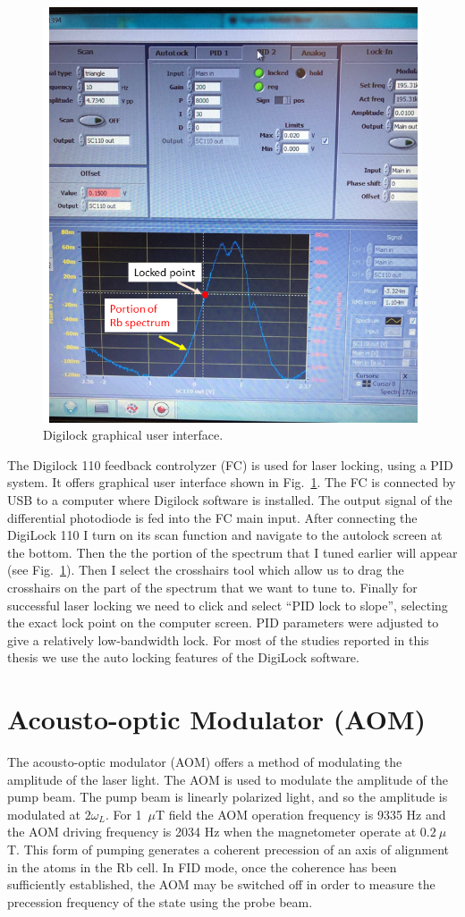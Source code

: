 \begin{figure}%
\centering
\includegraphics[width=0.7\linewidth]{figures/digilock.png}
\caption{Digilock graphical user interface.\label{fig:digilock}}
\end{figure}

The Digilock 110 feedback controlyzer (FC) is used for laser locking,
using a PID system.  It offers graphical user interface shown in
Fig.~\ref{fig:digilock}.  The FC is connected by USB to a computer
where Digilock software is installed. The output signal of the
differential photodiode is fed into the FC main input.  After
connecting the DigiLock 110 I turn on its scan function and navigate
to the autolock screen at the bottom. Then the the portion of the
spectrum that I tuned earlier will appear (see
Fig.~\ref{fig:digilock}). Then I select the crosshairs tool which
allow us to drag the crosshairs on the part of the spectrum that we
want to tune to. Finally for successful laser locking we need to click
and select ``PID lock to slope'', selecting the exact lock point on
the computer screen.  PID parameters were adjusted to give a
relatively low-bandwidth lock.  For most of the studies reported in
this thesis we use the auto locking features of the DigiLock software.


\section{Acousto-optic Modulator (AOM)\label{sec:AOM}}

The acousto-optic modulator (AOM) offers a method of modulating the
amplitude of the laser light.  The AOM is used to modulate the
amplitude of the pump beam. The pump beam is linearly polarized light,
and so the amplitude is modulated at $2\omega_L$.  For 1~$\mu$T field
the AOM operation frequency is 9335 Hz and the AOM driving frequency
is 2034 Hz when the magnetometer operate at $0.2~\mu$T.  This form of
pumping generates a coherent precession of an axis of alignment in the
atoms in the Rb cell. In FID mode, once the coherence has been
sufficiently established, the AOM may be switched off in order to
measure the precession frequency of the state using the probe beam.

